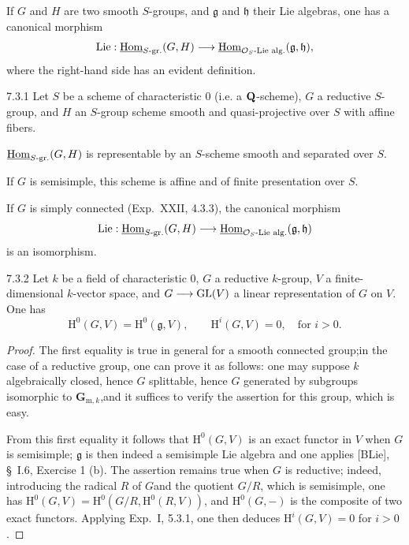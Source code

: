 If $G$ and $H$ are two smooth $S$-groups, and $\mathfrak g$ and $\mathfrak h$ their Lie algebras, one has a canonical morphism
\[
\operatorname{Lie}:\underline{\operatorname{Hom}}_{S\text{-gr.}}(G,H)\longrightarrow\underline{\operatorname{Hom}}_{\mathcal{O}_S\text{-Lie alg.}}(\mathfrak g,\mathfrak h),
\]
where the right-hand side has an evident definition.
\begin{proposition}{7.3.1}\label{XXIV.7.3.1}
Let $S$ be a scheme of characteristic 0 (i.e. a $\mathbf{Q}$-scheme), $G$ a reductive $S$-group, and $H$ an $S$-group scheme smooth and quasi-projective over $S$ with affine fibers.
\begin{enumeratei}
\item $\underline{\operatorname{Hom}}_{S\text{-gr.}}(G,H)$ is representable by an $S$-scheme smooth and separated over $S$.
\item If $G$ is semisimple, this scheme is affine and of finite presentation over $S$.
\item If $G$ is simply connected (Exp.~XXII, 4.3.3), the canonical morphism
\[
\operatorname{Lie}:\underline{\operatorname{Hom}}_{S\text{-gr.}}(G,H)\longrightarrow\underline{\operatorname{Hom}}_{\mathcal{O}_S\text{-Lie alg.}}(\mathfrak g,\mathfrak h)
\]
is an isomorphism.
\end{enumeratei}
\end{proposition}
\begin{lemma}{7.3.2}\label{XXIV.7.3.2}
Let $k$ be a field of characteristic 0, $G$ a reductive $k$-group, $V$ a finite-dimensional $k$-vector space, and $G\longrightarrow\operatorname{GL}(V)$ a linear representation of $G$ on $V$. One has
\[
\mathrm H^0(G,V)=\mathrm H^0(\mathfrak g,V),\qquad\mathrm H^i(G,V)=0,\quad\text{for }i>0.
\]
\end{lemma}
\begin{proof}
The first equality is true in general for a smooth connected group;in the case of a reductive group, one can prove it as follows: one may suppose $k$ algebraically closed, hence $G$ splittable, hence $G$ generated by subgroups isomorphic to $\mathbf G_{\mathrm m,k}$,and it suffices to verify the assertion for this group, which is easy.

From this first equality it follows that $\mathrm H^0(G,V)$ is an exact functor in $V$ when $G$ is semisimple; $\mathfrak g$ is then indeed a semisimple Lie algebra and one applies [BLie], §~I.6, Exercise 1 (b). The assertion remains true when $G$ is reductive; indeed, introducing the radical $R$ of $G$and the quotient $G/R$, which is semisimple, one has $\mathrm H^0(G,V)=\mathrm H^0(G/R,\mathrm H^0(R,V))$, and $\mathrm H^0(G,-)$ is the composite of two exact functors. Applying Exp.~I, 5.3.1, one then deduces $\mathrm H^i(G,V)=0$ for $i>0$.
\end{proof}
